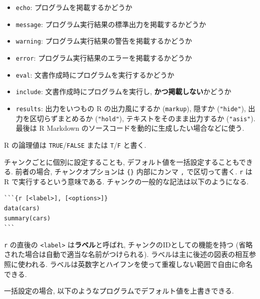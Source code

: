 \documentclass[
]{bxjsbook}
\newenvironment{Shaded}{\begin{snugshade}}{\end{snugshade}}
\newcommand{\AttributeTok}[1]{\textcolor[rgb]{0.77,0.63,0.00}{#1}}
\newcommand{\FunctionTok}[1]{\textcolor[rgb]{0.00,0.00,0.00}{#1}}
\newcommand{\NormalTok}[1]{#1}
\newcommand{\SpecialCharTok}[1]{\textcolor[rgb]{0.00,0.00,0.00}{#1}}
\providecommand{\tightlist}{%
  \setlength{\itemsep}{0pt}\setlength{\parskip}{0pt}}
\newenvironment{infobox}[1]{\begin{itemize}\renewcommand{\labelitemi}{\raisebox{-.7\height}[0pt][0pt]{%
  {\setkeys{Gin}{width=3em,keepaspectratio}\texttt{[image: \_latex/\_img/\#1]}}}}
  \setlength{\fboxsep}{1em}
  \begin{greyblock}
  \item
  }{\end{greyblock}\end{itemize}
}
\newenvironment{memo}{\begin{infobox}{memo}}{\end{infobox}}
\theoremstyle{definition}
\theoremstyle{definition}
\theoremstyle{definition}
\theoremstyle{remark}
\begin{document}
\begin{itemize}
\tightlist
\item
  \texttt{echo}: プログラムを掲載するかどうか
\item
  \texttt{message}: プログラム実行結果の標準出力を掲載するかどうか
\item
  \texttt{warning}: プログラム実行結果の警告を掲載するかどうか
\item
  \texttt{error}: プログラム実行結果のエラーを掲載するかどうか
\item
  \texttt{eval}: 文書作成時にプログラムを実行するかどうか
\item
  \texttt{include}: 文書作成時にプログラムを実行し,
  \textbf{かつ掲載しない}かどうか
\item
  \texttt{results}: 出力をいつもの R の出力風にするか (\texttt{markup}),
  隠すか (\texttt{"hide"}), 出力を区切らずまとめるか (\texttt{"hold"}),
  テキストをそのまま出力するか (\texttt{"asis"}). 最後は R Markdown
  のソースコードを動的に生成したい場合などに使う.
\end{itemize}

\begin{memo}
R の論理値は \texttt{TRUE}/\texttt{FALSE} または \texttt{T}/\texttt{F}
と書く.
\end{memo}

チャンクごとに個別に設定することも,
デフォルト値を一括設定することもできる. 前者の場合, チャンクオプションは
\texttt{\{\}} 内部にカンマ \texttt{,} で区切って書く. \texttt{r} は R
で実行するという意味である. チャンクの一般的な記法は以下のようになる.

\begin{verbatim}
```{r [<label>], [<options>]}
data(cars)
summary(cars)
```
\end{verbatim}

\texttt{r} の直後の \texttt{\textless{}label\textgreater{}}
は\textbf{ラベル}と呼ばれ, チャンクのIDとしての機能を持つ
(省略された場合は自動で適当な名前がつけられる).
ラベルは主に後述の図表の相互参照に使われる.
ラベルは英数字とハイフンを使って重複しない範囲で自由に命名できる.

一括設定の場合, 以下のようなプログラムでデフォルト値を上書きできる.

\begin{Shaded}
\end{Shaded}
\end{document}
